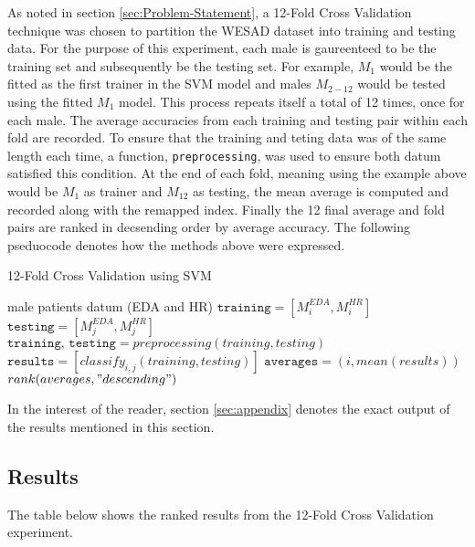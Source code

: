As noted in section \ref{sec:Problem-Statement}, a 12-Fold Cross Validation technique was chosen 
to partition the WESAD dataset into training and testing data. For the purpose of 
this experiment, each male is gaureenteed to be the training set and subsequently be 
the testing set. For example, $M_1$ would be the fitted as the first trainer in 
the SVM model and males $M_{2-12}$ would be tested using the fitted $M_1$ model. 
This process repeats itself a total of 12 times, once for each male. The average 
accuracies from each training and testing pair within each fold are recorded. 
To ensure that the training and teting data was of the same length each time, 
a function, \texttt{preprocessing}, was used to ensure both datum satisfied this condition.
At the end of each fold, meaning using the example above would be $M_1$ 
as trainer and $M_{12}$ as testing, the mean average is computed and recorded 
along with the remapped index. Finally the 12 final average and fold pairs 
are ranked in decsending order by average accuracy. The following pseduocode 
denotes how the methods above were expressed. 

\begin{algorithm}
\caption{12-Fold Cross Validation using SVM}\label{12FCV}
\begin{algorithmic}[1]
\scriptsize
{} male patients datum (EDA and HR)
\State $\texttt{training} = [M_i^{EDA}, M_i^{HR}]$
 
\State $\texttt{testing} = [M_j^{EDA}, M_j^{HR}]$
\State $\texttt{training, testing} = preprocessing(training, testing)$
\EndIf
\State $\texttt{results} = [classify_{i,j}(training, testing)]$
\EndFor
\State $\texttt{averages} = (i,mean(results))$ 
\EndFor
\State $rank(averages, "descending")$
\end{algorithmic}
\end{algorithm}

In the interest of the reader, section \ref{sec:appendix} denotes the exact output of the 
results mentioned in this section.

\subsection{Results}
\label{sec:Results}

The table below shows the ranked results from the 12-Fold Cross Validation experiment.

